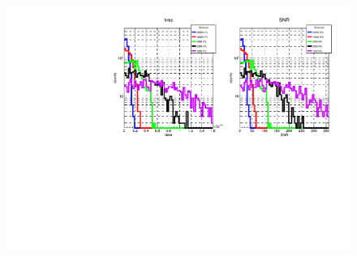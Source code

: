 \begin{center}
	\begin{figure}[H]
		\centering
		\includegraphics[scale=0.68, angle=0]{figures/Capitolo_4/hrss_snr_Distribution.pdf}
		\setlength{\belowcaptionskip}{-20pt}
		\caption{}
		\label{fig:hrss_snr_distribution}
	\end{figure}
\end{center}	

\lipsum[8]
\lipsum[9]